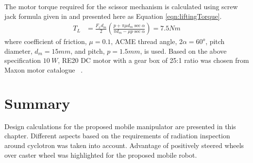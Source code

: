 The motor torque required for the scissor mechanism is calculated using  screw jack formula given in  \cite{TOMBook} and  presented here as Equation \ref{eqn:liftingTorque}. 
\begin{equation}
\label{eqn:liftingTorque}
\begin{aligned}
T_L&=\frac{F_x d_m}{2}(\frac{p+\pi\mu d_m\sec\alpha}{\pi d_m-\mu p\sec \alpha})=7.5Nm
\end{aligned}
\end{equation}
where coefficient of friction, $\mu=0.1$, ACME thread angle, $2\alpha=60^o$, pitch diameter, $d_m=15mm$, and pitch, $p=1.5mm$, is used. Based on the above specification $10~W$, RE20 DC motor with a gear box of 25:1 ratio was chosen from Maxon motor catalogue ~\cite{catMaxon}.



  
  

\section{Summary}
Design calculations for the proposed  mobile manipulator are presented in this chapter. Different aspects based on the requirements of radiation inspection around cyclotron was taken into account. Advantage of positively steered wheels over caster wheel was highlighted for the proposed mobile robot. 

